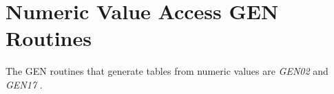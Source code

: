\begin{comment}
\documentclass[10pt]{article}
\usepackage{fullpage, graphicx, url}
\setlength{\parskip}{1ex}
\setlength{\parindent}{0ex}
\title{Numeric Value Access GEN Routines}



\begin{tabular}{ccc}
The Alternative Csound Reference Manual & & \\
Previous &The Standard Numeric Score &Next

\end{tabular}

\end{comment}
\section{Numeric Value Access GEN Routines}


  The GEN routines that generate tables from numeric values are \emph{GEN02}
 and \emph{GEN17}
. 


\begin{comment}
\begin{tabular}{lcr}
Previous &Home &Next \\
File Access GEN Routines &Up &Window Function GEN Routines

\end{tabular}



\end{comment}

